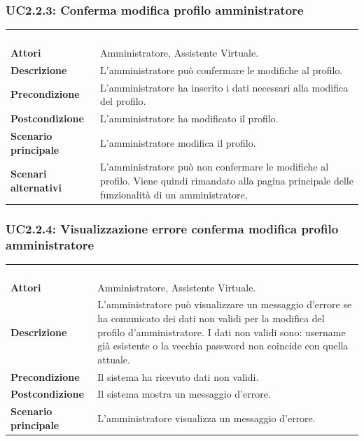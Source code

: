 \subsubsection{UC2.2.3: Conferma modifica profilo amministratore}
\label{UC2.2.3}
\begin{longtable}{l|p{10cm}}
\rowcolor[gray]{0.8} \multicolumn{2}{c}{} \\
\rowcolor[gray]{0.8} \multicolumn{2}{c}{\textbf{UC2.2.3 - Conferma modifica profilo amministratore}} \\
\rowcolor[gray]{0.8} \multicolumn{2}{c}{} \\
\hline
&\\
\textbf{Attori} & Amministratore, Assistente Virtuale.\\[7pt]
\textbf{Descrizione} & L'amministratore può confermare le modifiche al profilo.\\[7pt]
\textbf{Precondizione} & L'amministratore ha inserito i dati necessari alla modifica del profilo.\\[7pt]
\textbf{Postcondizione} & L'amministratore ha modificato il profilo.\\[7pt]
\textbf{Scenario principale} &L'amministratore modifica il profilo.\\[7pt]
\textbf{Scenari alternativi} & L'amministratore può non confermare le modifiche al profilo. Viene quindi rimandato alla pagina principale delle funzionalità di un amministratore,\\[7pt]\hline
\end{longtable}

\subsubsection{UC2.2.4: Visualizzazione errore conferma modifica profilo amministratore }
\label{UC2.2.4}
\begin{longtable}{l|p{10cm}}
\rowcolor[gray]{0.8} \multicolumn{2}{c}{} \\
\rowcolor[gray]{0.8} \multicolumn{2}{c}{\textbf{UC2.2.4 - Visualizzazione errore conferma modifica profilo amministratore }} \\
\rowcolor[gray]{0.8} \multicolumn{2}{c}{} \\
\hline
&\\
\textbf{Attori} & Amministratore, Assistente Virtuale.\\[7pt]
\textbf{Descrizione} & L'amministratore può visualizzare un messaggio d'errore se ha comunicato dei dati non validi per la modifica del profilo d'amministratore.
I dati non validi sono: username già esistente o la vecchia password non coincide con quella attuale.\\[7pt]
\textbf{Precondizione} & Il sistema ha ricevuto dati non validi.\\[7pt]
\textbf{Postcondizione} & Il sistema mostra un messaggio d'errore.\\[7pt]
\textbf{Scenario principale} &L'amministratore visualizza un messaggio d'errore.\\[7pt]\hline
\end{longtable}

